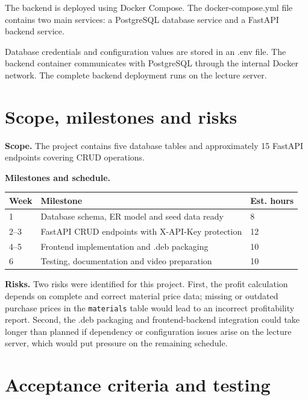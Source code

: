 \documentclass[11pt,a4paper]{article}
\begin{document}
The backend is deployed using Docker Compose.
The docker-compose.yml file contains two main services:
a PostgreSQL database service and a FastAPI backend service.

Database credentials and configuration values are stored in an .env file.
The backend container communicates with PostgreSQL through the internal Docker
network. The complete backend deployment runs on the lecture server.

\section{Scope, milestones and risks}

\textbf{Scope.} The project contains five database tables and approximately 15 FastAPI endpoints covering CRUD operations.

\textbf{Milestones and schedule.}

\renewcommand{\arraystretch}{1.2}
\begin{tabularx}{\linewidth}{@{}p{1.4cm}Xp{1.8cm}@{}}
\toprule
\textbf{Week} & \textbf{Milestone} & \textbf{Est. hours} \\
\midrule
1 & Database schema, ER model and seed data ready & 8 \\
2--3 & FastAPI CRUD endpoints with X-API-Key protection & 12 \\
4--5 & Frontend implementation and .deb packaging & 10 \\
6 & Testing, documentation and video preparation & 10 \\
\bottomrule
\end{tabularx}

\textbf{Risks.} Two risks were identified for this project. First, the profit
calculation depends on complete and correct material price data; missing or
outdated purchase prices in the \texttt{materials} table would lead to an
incorrect profitability report. Second, the .deb packaging and
frontend-backend integration could take longer than planned if dependency or
configuration issues arise on the lecture server, which would put pressure on
the remaining schedule.

\section{Acceptance criteria and testing}
\end{document}
